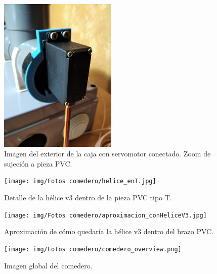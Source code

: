 \documentclass[12pt]{article}
\begin{document}
	\pagebreak

	\begin{figure}[h]
		\begin{center}
			\includegraphics[width=0.5\textwidth]{img/Fotos comedero/servo_sujecion_zoom.jpg}
			\caption{Imagen del exterior de la caja con servomotor conectado. Zoom de sujeción a pieza PVC.}
			\label{Prototipo: sujecion exterior servo (zoom)}
		\end{center}
	\end{figure}

	\pagebreak

	\begin{figure}[h]
		\begin{center}
			\texttt{[image: img/Fotos comedero/helice\_enT.jpg]}
			\caption{Detalle de la hélice v3 dentro de la pieza PVC tipo T.}
			\label{Prototipo: helice v3 dentro de pieza PVC tipo T.}
		\end{center}
	\end{figure}	
	
	\pagebreak

	\begin{figure}[h]
		\begin{center}
			\texttt{[image: img/Fotos comedero/aproximacion\_conHeliceV3.jpg]}
			\caption{Aproximación de cómo quedaría la hélice v3 dentro del brazo PVC.}
			\label{Prototipo: helice v3 dentro de brazo PVC (aproximación)}
		\end{center}
	\end{figure}	

	\pagebreak
	
	\begin{figure}[h]
		\begin{center}
			\texttt{[image: img/Fotos comedero/comedero\_overview.png]}
			\caption{Imagen global del comedero.}
			\label{Prototipo: comedero overview}
		\end{center}
	\end{figure}
\end{document}
